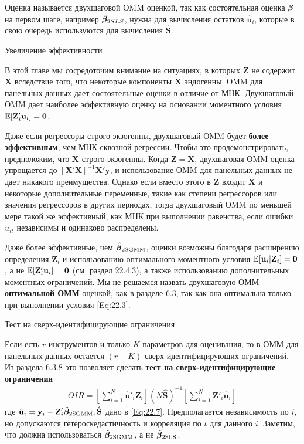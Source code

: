 Оценка называется двухшаговой ОMM оценкой, так как состоятельная оценка $\bm{\beta}$ на первом шаге, например $\hat{\bm{\beta}}_{\mathrm 2SLS}$, нужна для вычисления остатков $\hat{\mathbf u}_i$, которые в свою очередь используются для вычисления $\hat{\mathbf S}$.

{\centering Увеличение эффективности}

В этой главе мы сосредоточим внимание на ситуациях, в которых $\mathbf Z$ не содержит $\mathbf X$ вследствие того, что некоторые компоненты $ \mathbf X$ эндогенны. ОMM для панельных данных дает состоятельные оценки в отличие от МНК. Двухшаговый ОMM дает наиболее эффективную оценку на основании моментного условия $\mathbb{E}[ \mathbf Z'_i \mathbf u_i]=\mathbf 0$.

Даже если регрессоры строго экзогенны, двухшаговый ОMM будет \textbf{более эффективным}, чем МНК сквозной регрессии. Чтобы это продемонстрировать, предположим, что $\mathbf X$ строго экзогенны. Когда $\mathbf Z = \mathbf X$, двухшаговая ОMM оценка упрощается до  $[\mathbf X' \mathbf X]^{-1}\mathbf X' \mathbf y$, и использование ОMM для панельных данных не дает никакого преимущества. Однако если вместо этого в $\mathbf Z$  входит $\mathbf X$ и некоторые дополнительные переменные, такие как степени регрессоров или значения регрессоров в других периодах, тогда двухшаговый ОMM по меньшей мере такой же эффективный, как МНК при выполнении равенства, если ошибки $u_{it}$ независимы и одинаково распределены.

Даже более эффективные, чем $\hat{\bm{\beta}}_{\mathrm{2SGMM}}$, оценки возможны благодаря расширению определения $\mathbf Z_i$ и использованию оптимального моментного условия $\mathbb{E}[ \mathbf u_i| \mathbf Z_i]= \mathbf 0$, а не $\mathbb{E}[ \mathbf Z'_i \mathbf u_i] = \mathbf 0$ (см. раздел 22.4.3), а также использованию дополнительных моментных ограничений. Мы не решаемся назвать двухшаговую ОММ \textbf{оптимальной ОММ} оценкой,  как в разделе 6.3, так как она оптимальна только при выполнении условия \ref{Eq:22.3}.

{\centering Тест на сверх-идентифицирующие ограничения}

Если есть $r$  инструментов и только $K$  параметров для оценивания, то в ОММ для панельных данных остается $(r-K)$ сверх-идентифицирующих ограничений. Из раздела 6.3.8 это позволяет сделать \textbf{тест на сверх-идентифицирующие ограничения}
\begin{align}
OIR= \left[ \sum^N_{i=1} \hat{\mathbf u}'_i \mathbf Z_i \right] 
(N \hat{\mathbf S})^{-1}
 \left[ \sum^N_{i=1} \mathbf Z'_i \hat{\mathbf u}_i \right] 
\label{Eq:22.10}
\end{align}
где $\hat{ \mathbf u}_i=\mathbf y_i- \mathbf Z'_i \hat{\bm{\beta}}_{\mathrm{2SGMM}}, \hat{\mathbf S}$ дано в \ref{Eq:22.7}. Предполагается независимость по $i$, но допускаются гетероскедастичность и корреляция по $t$ для данного $i$. Заметим, что должна использоваться $\hat{\bm{\beta}}_{\mathrm{2SGMM}}$, а не $\hat{\bm{\beta}}_{\mathrm{2SLS}}$.

